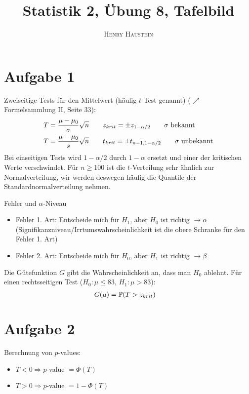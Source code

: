 \documentclass{article}
\title{\textbf{Statistik 2, Übung 8, Tafelbild}}
\author{\textsc{Henry Haustein}}
\date{}
\begin{document}
	\maketitle
	
	\section*{Aufgabe 1}
	Zweiseitige Tests für den Mittelwert (häufig $t$-Test genannt) ($\nearrow$ Formelsammlung II, Seite 33):
	\begin{align}
		T &= \frac{\mu - \mu_0}{\sigma}\sqrt{n} \qquad z_{krit} = \pm z_{1-\alpha/2} \qquad\sigma\text{ bekannt} \notag \\
		T &= \frac{\mu - \mu_0}{s}\sqrt{n} \qquad t_{krit} = \pm t_{n-1,1-\alpha/2} \qquad\sigma\text{ unbekannt} \notag
	\end{align}
	Bei einseitigen Tests wird $1-\alpha/2$ durch $1-\alpha$ ersetzt und einer der kritischen Werte verschwindet. Für $n\ge 100$ ist die $t$-Verteilung sehr ähnlich zur Normalverteilung, wir werden deswegen häufig die Quantile der Standardnormalverteilung nehmen.
	
	Fehler und $\alpha$-Niveau
	\begin{itemize}
		\item Fehler 1. Art: Entscheide mich für $H_1$, aber $H_0$ ist richtig $\to \alpha$ (Signifikanzniveau/Irrtumswahrscheinlichkeit ist die obere Schranke für den Fehler 1. Art)
		\item Fehler 2. Art: Entscheide mich für $H_0$, aber $H_1$ ist richtig $\to\beta$
	\end{itemize}
	Die Gütefunktion $G$ gibt die Wahrscheinlichkeit an, dass man $H_0$ ablehnt. Für einen rechtsseitigen Test ($H_0: \mu \le 83$, $H_1: \mu > 83$):
	\begin{align}
		G(\mu) &= \mathbb{P}(T > z_{krit}) \notag
	\end{align}
	

	\section*{Aufgabe 2}	
	Berechnung von $p$-values:
	\begin{itemize}
		\item $T<0\Rightarrow p$-value $= \Phi(T)$
		\item $T>0\Rightarrow p$-value $= 1-\Phi(T)$
	\end{itemize}
	
\end{document}
